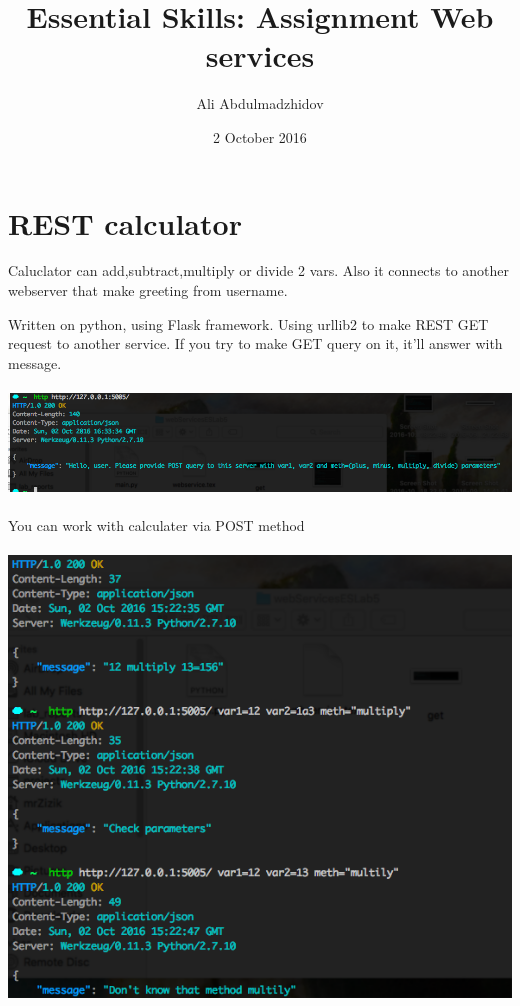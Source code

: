 \documentclass[10pt]{article}
\title{Essential Skills: Assignment Web services}
\date{2 October 2016}
\author{Ali Abdulmadzhidov}
\begin{document}
\renewcommand*\rmdefault{cmss}
\maketitle
\section{REST calculator}
Caluclator can add,subtract,multiply or divide 2 vars. Also it connects to another webserver that make greeting from username.

Written on python, using Flask framework. Using urllib2 to make REST GET request to another service.
If you try to make GET query on it, it'll answer with message. \\ \\
\includegraphics[scale=0.5]{get} \\ \\
You can work with calculater via POST method \\ \\ 
\includegraphics[scale=0.5]{post}
\end{document}
